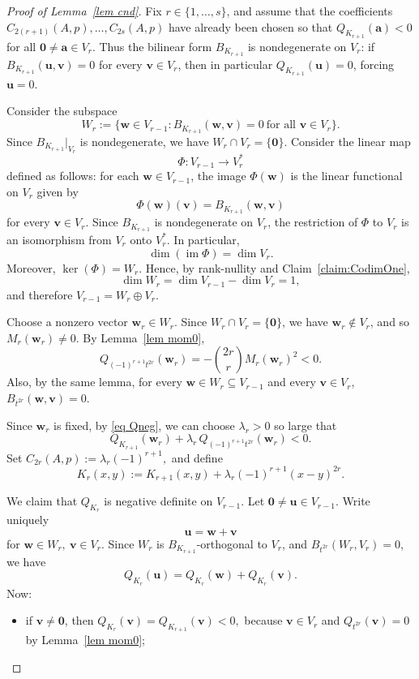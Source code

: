 \documentclass[11pt]{article}
\theoremstyle{definition}
\begin{document}
\begin{proof}[Proof of Lemma~\ref{lem cnd}]
	
	Fix $r\in\{1,\dots,s\}$, and assume that the coefficients
	$C_{2(r+1)}(A,p),\dots,C_{2s}(A,p)$ have already been chosen so that
	\(
	Q_{K_{r+1}}(\boldsymbol{a})<0\) for all
	\(\boldsymbol{0}\ne \boldsymbol{a}\in V_r.
	\)
	Thus the bilinear form \(B_{K_{r+1}}\) is nondegenerate on \(V_r\): if
\(B_{K_{r+1}}(\boldsymbol u,\boldsymbol v)=0\) for every
\(\boldsymbol v\in V_r\), then in particular
\(Q_{K_{r+1}}(\boldsymbol u)=0\), forcing \(\boldsymbol u=0\).
	
	Consider the subspace
	\[
	W_r:=\{\boldsymbol{w}\in V_{r-1}: B_{K_{r+1}}(\boldsymbol{w},\boldsymbol{v})=0\ \text{for all }\boldsymbol{v}\in V_r\}.
	\]
	Since $B_{K_{r+1}}|_{V_r}$ is nondegenerate, we have
	\(
	W_r\cap V_r=\{\boldsymbol{0}\}.
	\)
	Consider the linear map
\[
\Phi:V_{r-1}\longrightarrow V_r^*
\]
defined as follows: for each \(\boldsymbol w\in V_{r-1}\), the image
\(\Phi(\boldsymbol w)\) is the linear functional on \(V_r\) given by
\[
\Phi(\boldsymbol w)(\boldsymbol v)
=
B_{K_{r+1}}(\boldsymbol w,\boldsymbol v)
\]
for every \(\boldsymbol v\in V_r\). Since \(B_{K_{r+1}}\) is nondegenerate on
\(V_r\), the restriction of \(\Phi\) to \(V_r\) is an isomorphism from \(V_r\)
onto \(V_r^*\). In particular,
\[
\dim(\operatorname{im}\Phi)=\dim V_r.
\]
	Moreover,
	\(
	\ker(\Phi)=W_r.
	\)
	Hence, by rank-nullity and Claim~\ref{claim:CodimOne},
	\[
	\dim W_r=\dim V_{r-1}-\dim V_r=1,
	\]
	and therefore
	\(
	V_{r-1}=W_r\oplus V_r.
	\)
	
	Choose a nonzero vector $\boldsymbol{w}_r\in W_r$. Since $W_r\cap V_r=\{\boldsymbol{0}\}$, we have
	$\boldsymbol{w}_r\notin V_r$, and so $M_r(\boldsymbol{w}_r)\ne 0$. By
	Lemma~\ref{lem mom0},
	\begin{equation}\label{eq Qneg}
		Q_{(-1)^{r+1}t^{2r}}(\boldsymbol{w}_r)
		=
		-\binom{2r}{r}M_r(\boldsymbol{w}_r)^2<0.
	\end{equation}
	Also, by the same lemma, for every $\boldsymbol{w}\in W_r\subseteq V_{r-1}$ and every $\boldsymbol{v}\in V_r$,
	\(
	B_{t^{2r}}(\boldsymbol{w},\boldsymbol{v})=0.
	\)
	
	Since $\boldsymbol{w}_r$ is fixed, by \eqref{eq Qneg}, we can choose $\lambda_r>0$ so large that
	\[
	Q_{K_{r+1}}(\boldsymbol{w}_r)+\lambda_r\,Q_{(-1)^{r+1}t^{2r}}(\boldsymbol{w}_r)<0.
	\]
	Set
	\(
	C_{2r}(A,p):=\lambda_r(-1)^{r+1},
	\)
	and define
	\[
	K_r(x,y):=K_{r+1}(x,y)+\lambda_r(-1)^{r+1}(x-y)^{2r}.
	\]
	
	We claim that $Q_{K_r}$ is negative definite on $V_{r-1}$.
	Let $\boldsymbol{0}\ne \boldsymbol{u}\in V_{r-1}$. Write uniquely
	\[
\boldsymbol{u}=\boldsymbol{w}+\boldsymbol{v}
	\]
    for \(\boldsymbol{w}\in W_r,\ \boldsymbol{v}\in V_r.\)
	Since $W_r$ is $B_{K_{r+1}}$-orthogonal to $V_r$, and
	$B_{t^{2r}}(W_r,V_r)=0$, we have
	\[
	Q_{K_r}(\boldsymbol{u})=Q_{K_r}(\boldsymbol{w})+Q_{K_r}(\boldsymbol{v}).
	\]
	Now:
	\begin{itemize}
		\item if $\boldsymbol{v}\ne \boldsymbol{0}$, then
		\(
		Q_{K_r}(\boldsymbol{v})=Q_{K_{r+1}}(\boldsymbol{v})<0,
		\)
		because $\boldsymbol{v}\in V_r$ and $Q_{t^{2r}}(\boldsymbol{v})=0$ by
		Lemma~\ref{lem mom0};
		

\end{itemize}
\end{proof}
\end{document}
